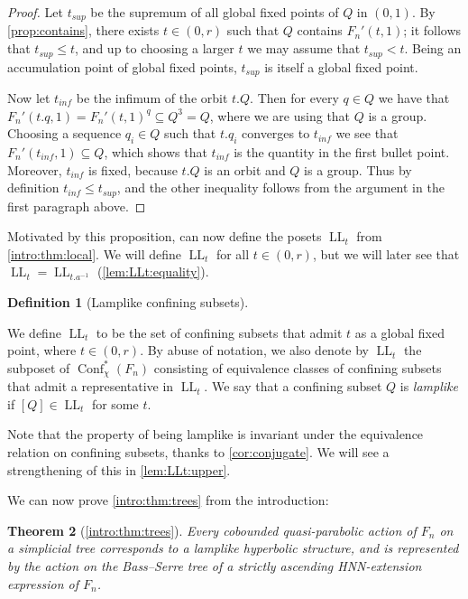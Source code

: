 \documentclass[reqno,12pt]{amsart}\setcounter{tocdepth}{1}
\newtheorem{theorem}{Theorem}[section]
\theoremstyle{definition}
\newtheorem{definition}[theorem]{Definition}
\DeclareMathOperator{\Conf}{Conf}
\DeclareMathOperator{\LL}{LL}
\numberwithin{equation}{section}
\begin{document}
\begin{proof}
Let $t_{sup}$ be the supremum of all global fixed points of $Q$ in $(0, 1)$. By \cref{prop:contains}, there exists $t \in (0, r)$ such that $Q$ contains $F_n'(t, 1)$; it follows that $t_{sup} \leq t$, and up to choosing a larger $t$ we may assume that $t_{sup} < t$. Being an accumulation point of global fixed points, $t_{sup}$ is itself a global fixed point.

Now let $t_{inf}$ be the infimum of the orbit $t.Q$. Then for every $q \in Q$ we have that $F_n'(t.q, 1) = F_n'(t,1)^q \subseteq Q^3 = Q$, where we are using that $Q$ is a group. Choosing a sequence $q_i \in Q$ such that $t.q_i$ converges to $t_{inf}$ we see that $F_n'(t_{inf}, 1) \subseteq Q$, which shows that $t_{inf}$ is the quantity in the first bullet point. Moreover, $t_{inf}$ is fixed, because $t.Q$ is an orbit and $Q$ is a group. Thus by definition $t_{inf} \leq t_{sup}$, and the other inequality follows from the argument in the first paragraph above.
\end{proof}

Motivated by this proposition, can now define the posets $\LL_t$ from \cref{intro:thm:local}. We will define $\LL_t$ for all $t \in (0, r)$, but we will later see that $\LL_t = \LL_{t.a^{-1}}$ (\cref{lem:LLt:equality}).

\begin{definition}[Lamplike confining subsets]
\label{def:lamplike:moving}

We define $\LL_t$ to be the set of confining subsets that admit $t$ as a global fixed point, where $t \in (0, r)$. By abuse of notation, we also denote by $\LL_t$ the subposet of $\Conf^\ast_\chi(F_n)$ consisting of equivalence classes of confining subsets that admit a representative in $\LL_t$.
We say that a confining subset $Q$ is \emph{lamplike} if $[Q] \in \LL_t$ for some $t$.
\end{definition}

Note that the property of being lamplike is invariant under the equivalence relation on confining subsets, thanks to \cref{cor:conjugate}. We will see a strengthening of this in \cref{lem:LLt:upper}.

\medskip

We can now prove \cref{intro:thm:trees} from the introduction:

\begin{theorem}[\cref{intro:thm:trees}]
    Every cobounded quasi-parabolic action of $F_n$ on a simplicial tree corresponds to a lamplike hyperbolic structure, and is represented by the action on the Bass--Serre tree of a strictly ascending HNN-extension expression of $F_n$.
\end{theorem}
\end{document}
